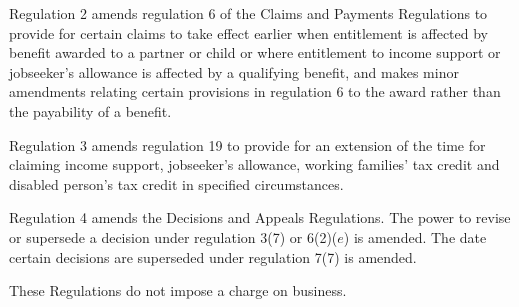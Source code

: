 \documentclass[12pt,a4paper]{article}
\begin{document}
Regulation 2 amends regulation 6 of the Claims and Payments Regulations to provide for certain claims to take effect earlier when entitlement is affected by benefit awarded to a partner or child or where entitlement to income support or jobseeker’s allowance is affected by a qualifying benefit, and makes minor amendments relating certain provisions in regulation 6 to the award rather than the payability of a benefit.

Regulation 3 amends regulation 19 to provide for an extension of the time for claiming income support, jobseeker’s allowance, working families' tax credit and disabled person’s tax credit in specified circumstances.

Regulation 4 amends the Decisions and Appeals Regulations. The power to revise or supersede a decision under regulation 3(7) or 6(2)($e$)  is amended. The date certain decisions are superseded under regulation 7(7) is amended.

These Regulations do not impose a charge on business. 
\end{document}
